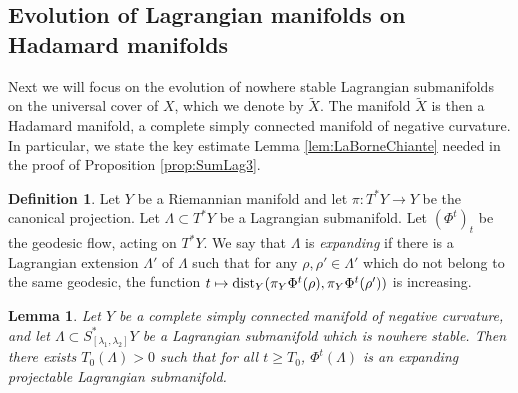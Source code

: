 \documentclass[JEP,XML,SOM,Unicode,published]{cedram}
\newcommand\mto{\mathchoice{\longmapsto}{\mapsto}{\mapsto}{\mapsto}}
\DeclareMathOperator{\dist}{dist}
\theoremstyle{plain}
\newtheorem{lemma}[theorem]{Lemma}
\theoremstyle{definition}
\newtheorem{definition}[theorem]{Definition}
\begin{document}
\subsection{Evolution of Lagrangian manifolds on Hadamard manifolds}\label{ss:ClassicHadamard}

Next we will focus on the evolution of nowhere stable Lagrangian submanifolds on the universal cover of $X$, which we denote by $\tilde{X}$. The manifold $\tilde{X}$ is then a Hadamard manifold, \ie a complete simply connected manifold of negative curvature. In particular, we state the key estimate Lemma \ref{lem:LaBorneChiante} needed in the proof of Proposition \ref{prop:SumLag3}.

\begin{definition}
Let $Y$ be a Riemannian manifold and let $\pi:T^*Y\to Y$ be the canonical projection. Let $\Lambda\subset T^*Y$ be a Lagrangian submanifold. Let $(\Phi^t)_t$ be the geodesic flow, acting on $T^*Y$. We say that $\Lambda$ is \emph{expanding} if there is a Lagrangian extension $\Lambda'$ of $\Lambda$ such that for any $\rho,\rho'\in\Lambda'$ which do not belong to the same geodesic, the function $t\mto\dist_Y(\pi_Y\Phi^t(\rho),\pi_Y \Phi^t(\rho'))$ is increasing.
\end{definition}

\begin{lemma}\label{lem:LongTimeProj}
Let $Y$ be a complete simply connected manifold of negative curvature, and let $\Lambda\subset S^*_{[\lambda_1,\lambda_2]}Y$ be a Lagrangian submanifold which is nowhere stable. Then there exists $T_0(\Lambda)>0$ such that for all $t\geq T_0$, $\Phi^{t} (\Lambda)$ is an expanding projectable Lagrangian submanifold.
\end{lemma}
\end{document}
